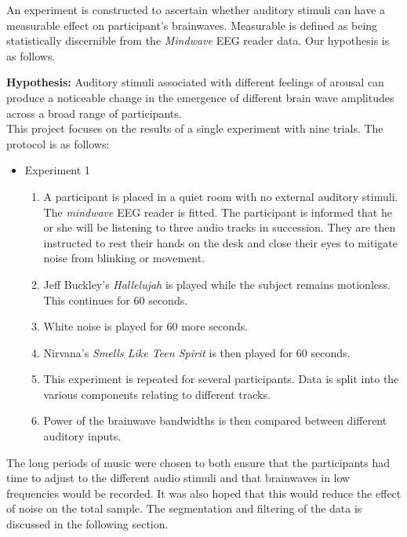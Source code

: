 \documentclass[twocolumn,superscriptaddress]{revtex4-1}
\theoremstyle{definition}
\theoremstyle{remark}
\begin{document}
An experiment is constructed to ascertain whether auditory stimuli can have a measurable effect on participant's brainwaves. Measurable is defined as being statistically discernible from the \emph{Mindwave} EEG reader data. Our hypothesis is as follows.

\textbf{Hypothesis:}
Auditory stimuli associated with different feelings of arousal can produce a noticeable change in the emergence of different brain wave amplitudes across a broad range of participants.\\

This project focuses on the results of a single experiment with nine trials. The protocol is as follows:

\begin{itemize}
\item Experiment 1
\begin{enumerate}
\item A participant is placed in a quiet room with no external auditory stimuli. The \emph{mindwave} EEG reader is fitted. The participant is informed that he or she will be listening to three audio tracks in succession. They are then instructed to rest their hands on the desk and close their eyes to mitigate noise from blinking or movement.
\item Jeff Buckley’s \emph{Hallelujah} is played while the subject remains motionless. This continues for 60 seconds. 
\item White noise is played for 60 more seconds. 
\item Nirvana’s \emph{Smells Like Teen Spirit} is then played for 60 seconds. 
\item This experiment is repeated for several participants. Data is split into the various components relating to different tracks. 
\item Power of the brainwave bandwidths is then compared between different auditory inputs. 

\end{enumerate}
\end{itemize}

The long periods of music were chosen to both ensure that the participants had time to adjust to the different audio stimuli and that brainwaves in low frequencies would be recorded. It was also hoped that this would reduce the effect of noise on the total sample. The segmentation and filtering of the data is discussed in the following section. 
\end{document}
